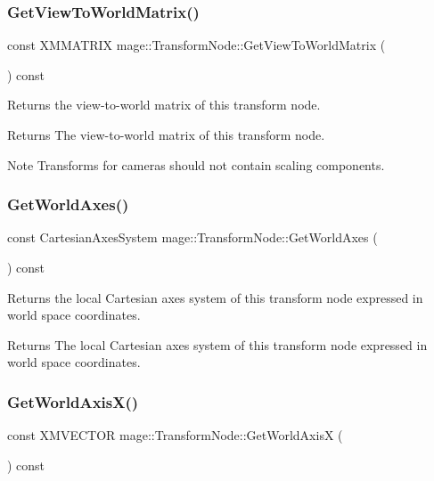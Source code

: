 \subsubsection{\texorpdfstring{Get\+View\+To\+World\+Matrix()}{GetViewToWorldMatrix()}}
{\footnotesize\ttfamily const X\+M\+M\+A\+T\+R\+IX mage\+::\+Transform\+Node\+::\+Get\+View\+To\+World\+Matrix (\begin{DoxyParamCaption}{ }\end{DoxyParamCaption}) const}

Returns the view-\/to-\/world matrix of this transform node.

\begin{DoxyReturn}{Returns}
The view-\/to-\/world matrix of this transform node. 
\end{DoxyReturn}
\begin{DoxyNote}{Note}
Transforms for cameras should not contain scaling components. 
\end{DoxyNote}
\hypertarget{classmage_1_1_transform_node_ae49484fd95f20ada6c6b1100fd681c9c}{}\label{classmage_1_1_transform_node_ae49484fd95f20ada6c6b1100fd681c9c} 
\subsubsection{\texorpdfstring{Get\+World\+Axes()}{GetWorldAxes()}}
{\footnotesize\ttfamily const Cartesian\+Axes\+System mage\+::\+Transform\+Node\+::\+Get\+World\+Axes (\begin{DoxyParamCaption}{ }\end{DoxyParamCaption}) const}

Returns the local Cartesian axes system of this transform node expressed in world space coordinates.

\begin{DoxyReturn}{Returns}
The local Cartesian axes system of this transform node expressed in world space coordinates. 
\end{DoxyReturn}
\hypertarget{classmage_1_1_transform_node_a138fda019d9d42e483c5e50855e2df9f}{}\label{classmage_1_1_transform_node_a138fda019d9d42e483c5e50855e2df9f} 
\subsubsection{\texorpdfstring{Get\+World\+Axis\+X()}{GetWorldAxisX()}}
{\footnotesize\ttfamily const X\+M\+V\+E\+C\+T\+OR mage\+::\+Transform\+Node\+::\+Get\+World\+AxisX (\begin{DoxyParamCaption}{ }\end{DoxyParamCaption}) const}

